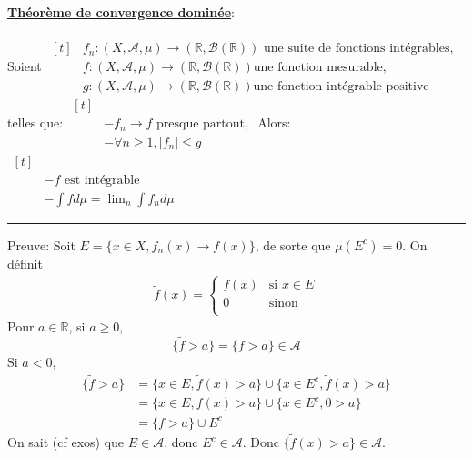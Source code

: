 \documentclass{report}
\date{}
\begin{document}
\underline{\textbf{Théorème de convergence dominée}}:\\\\
Soient $\begin{aligned}[t] &f_n:(X,\mathcal{A},\mu)\to (\mathbb R, \mathcal{B}(\mathbb R)) \text{ une suite de fonctions intégrables,} \\
&f:(X,\mathcal{A},\mu)\to (\mathbb R, \mathcal{B}(\mathbb R)) \text{une fonction mesurable,} \\
&g:(X,\mathcal{A},\mu)\to (\mathbb R, \mathcal{B}(\mathbb R)) \text{une fonction intégrable positive}
\end{aligned}$ \newline
telles que: $\begin{aligned}[t] &\\
& -f_n\to f \text{ presque partout,}\\
& -\forall n\geq 1, |f_n|\leq g
\end{aligned}$ \newline
Alors:  $\begin{aligned}[t] &\\
&-f \text{ est intégrable}\\
&-\int f d\mu  = \lim_n \int f_n d\mu
\end{aligned}$\newline \newline 
\noindent\rule[0.5ex]{\linewidth}{1pt}
Preuve: Soit $E=\{x\in X, f_n(x) \to f(x) \} $, de sorte que $\mu(E^c) =0$.\newline
On définit $$\begin{aligned}
  \widetilde{f}(x)=
  \begin{cases}
    f(x) & \text{si }  x\in E \\
    0 & \text{sinon }  \\
  \end{cases}
\end{aligned}$$\newline
Pour $a\in \mathbb R$, si $a\geq 0$, $$\{\widetilde{f}>a \} = \{f>a \}\in \mathcal A$$
Si $a<0$, $$\begin{aligned}\{\widetilde{f}>a \} &= \{x\in E, \widetilde{f}(x)> a\} \cup \{x\in E^c, \widetilde{f}(x)> a\} \\
&=\{x\in E, f(x)> a\} \cup \{x\in E^c, 0> a\} \\
&=\{f>a \} \cup E^c
\end{aligned} $$
On sait (cf exos) que $E\in \mathcal A$, donc $E^c \in \mathcal A$. Donc $\{\widetilde{f}(x)> a\}\in \mathcal A$.\newline \newline 
\end{document}

